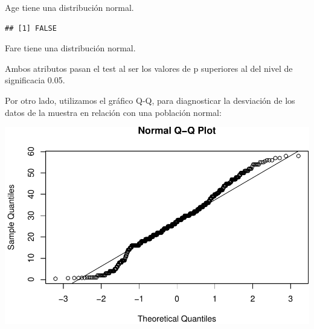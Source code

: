 \documentclass[]{article}
\newenvironment{Shaded}{\begin{snugshade}}{\end{snugshade}}
\newcommand{\FloatTok}[1]{\textcolor[rgb]{0.00,0.00,0.81}{#1}}
\newcommand{\KeywordTok}[1]{\textcolor[rgb]{0.13,0.29,0.53}{\textbf{#1}}}
\newcommand{\NormalTok}[1]{#1}
\newcommand{\OperatorTok}[1]{\textcolor[rgb]{0.81,0.36,0.00}{\textbf{#1}}}
\newcommand{\StringTok}[1]{\textcolor[rgb]{0.31,0.60,0.02}{#1}}
\begin{document}
Age tiene una distribución normal.

\begin{Shaded}
\end{Shaded}

\begin{verbatim}
## [1] FALSE
\end{verbatim}

Fare tiene una distribución normal.

Ambos atributos pasan el test al ser los valores de p superiores al del
nivel de significacia 0.05.

Por otro lado, utilizamos el gráfico Q-Q, para diagnosticar la
desviación de los datos de la muestra en relación con una población
normal:

\begin{Shaded}
\end{Shaded}

\includegraphics{titanic_data_analysis_PRA2_files/figure-latex/unnamed-chunk-19-1.pdf}

\begin{Shaded}
\end{Shaded}
\end{document}
